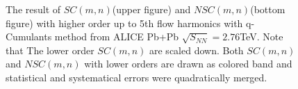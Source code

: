 	\begin{figure}[hp]
		\begin{center}
        \caption{The result of $SC(m,n)$(upper figure) and $NSC(m,n)$(bottom figure) with higher order up to 5th flow harmonics with q-Cumulants method from ALICE Pb+Pb $\sqrt{S_{NN}}=2.76$TeV. Note that The lower order $SC(m,n)$ are scaled down. Both $SC(m,n)$ and $NSC(m,n)$ with lower orders are drawn as colored band and statistical and systematical errors were quadratically merged. }
        \label{fig:highersc}
        \end{center}   
     \end{figure}


